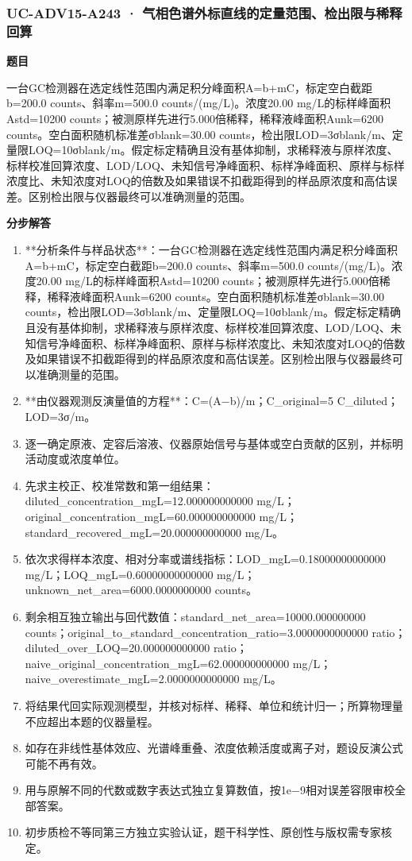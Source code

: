 \documentclass[UTF8,11pt,a4paper]{ctexart}
\begin{document}
\subsubsection*{UC-ADV15-A243 · 气相色谱外标直线的定量范围、检出限与稀释回算}
\noindent\textbf{题目}\par
一台GC检测器在选定线性范围内满足积分峰面积A=b+mC，标定空白截距b=200.0 counts、斜率m=500.0 counts/(mg/L)。浓度20.00 mg/L的标样峰面积Astd=10200 counts；被测原样先进行5.000倍稀释，稀释液峰面积Aunk=6200 counts。空白面积随机标准差σblank=30.00 counts，检出限LOD=3σblank/m、定量限LOQ=10σblank/m。假定标定精确且没有基体抑制，求稀释液与原样浓度、标样校准回算浓度、LOD/LOQ、未知信号净峰面积、标样净峰面积、原样与标样浓度比、未知浓度对LOQ的倍数及如果错误不扣截距得到的样品原浓度和高估误差。区别检出限与仪器最终可以准确测量的范围。\par
\medskip\noindent\textbf{分步解答}
\begin{enumerate}
\item **分析条件与样品状态**：一台GC检测器在选定线性范围内满足积分峰面积A=b+mC，标定空白截距b=200.0 counts、斜率m=500.0 counts/(mg/L)。浓度20.00 mg/L的标样峰面积Astd=10200 counts；被测原样先进行5.000倍稀释，稀释液峰面积Aunk=6200 counts。空白面积随机标准差σblank=30.00 counts，检出限LOD=3σblank/m、定量限LOQ=10σblank/m。假定标定精确且没有基体抑制，求稀释液与原样浓度、标样校准回算浓度、LOD/LOQ、未知信号净峰面积、标样净峰面积、原样与标样浓度比、未知浓度对LOQ的倍数及如果错误不扣截距得到的样品原浓度和高估误差。区别检出限与仪器最终可以准确测量的范围。
\item **由仪器观测反演量值的方程**：C=(A−b)/m；C\_original=5 C\_diluted；LOD=3σ/m。
\item 逐一确定原液、定容后溶液、仪器原始信号与基体或空白贡献的区别，并标明活动度或浓度单位。
\item 先求主校正、校准常数和第一组结果：diluted\_concentration\_mgL=12.000000000000 mg/L；original\_concentration\_mgL=60.000000000000 mg/L；standard\_recovered\_mgL=20.000000000000 mg/L。
\item 依次求得样本浓度、相对分率或谱线指标：LOD\_mgL=0.18000000000000 mg/L；LOQ\_mgL=0.60000000000000 mg/L；unknown\_net\_area=6000.0000000000 counts。
\item 剩余相互独立输出与回代数值：standard\_net\_area=10000.000000000 counts；original\_to\_standard\_concentration\_ratio=3.0000000000000 ratio；diluted\_over\_LOQ=20.000000000000 ratio；naive\_original\_concentration\_mgL=62.000000000000 mg/L；naive\_overestimate\_mgL=2.0000000000000 mg/L。
\item 将结果代回实际观测模型，并核对标样、稀释、单位和统计归一；所算物理量不应超出本题的仪器量程。
\item 如存在非线性基体效应、光谱峰重叠、浓度依赖活度或离子对，题设反演公式可能不再有效。
\item 用与原解不同的代数或数字表达式独立复算数值，按1e−9相对误差容限审校全部答案。
\item 初步质检不等同第三方独立实验认证，题干科学性、原创性与版权需专家核定。
\end{enumerate}
\end{document}
